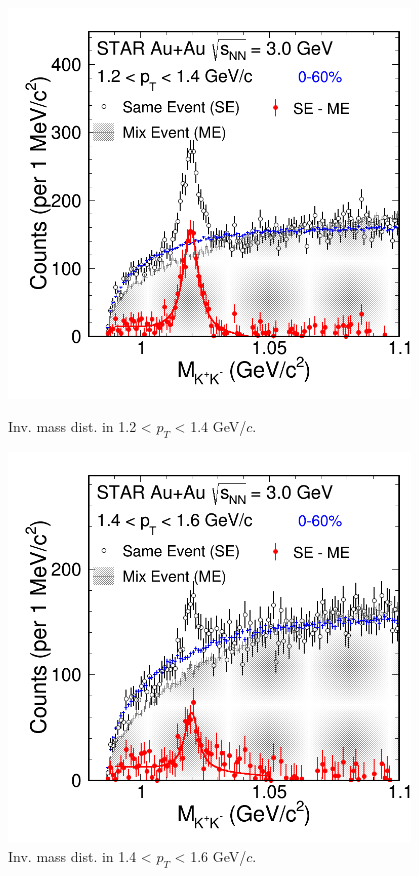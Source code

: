 \begin{figure}[htbp]
\begin{minipage}[htbp]{0.45\linewidth}
\centering
\includegraphics[width=0.95\textwidth]{chapterY/fig/fig1_signal_0_6.png}
\caption{Inv. mass dist. in 1.2 < $p_T$ < 1.4 GeV/$c$. \label{fig:mixedEvent_pT6}}
\end{minipage}
\hfill
\begin{minipage}[htbp]{0.45\linewidth}
\centering
\includegraphics[width=0.95\textwidth]{chapterY/fig/fig1_signal_0_7.png} 
\caption{Inv. mass dist. in 1.4 < $p_T$ < 1.6 GeV/$c$. \label{fig:mixedEvent_pT7}}
\end{minipage}
\end{figure}

